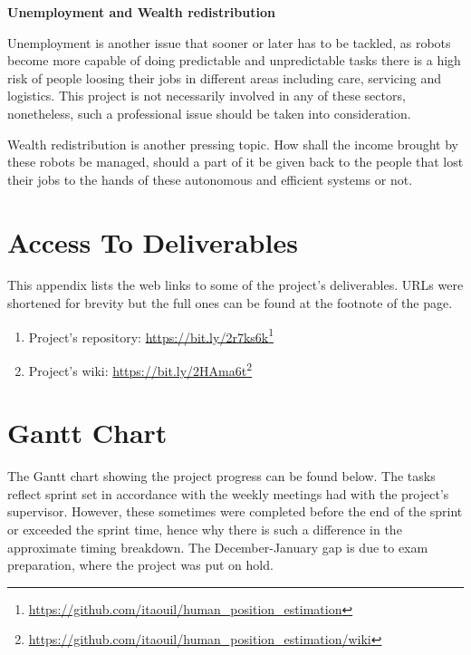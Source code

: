 \begin{appendices}
\textbf{Unemployment and Wealth redistribution}

Unemployment is another issue that sooner or later has to be tackled, as robots become more capable of doing predictable and unpredictable tasks there is a high risk of people loosing their jobs in different areas including care, servicing and logistics. This project is not necessarily involved in any of these sectors, nonetheless, such a professional issue should be taken into consideration.

Wealth redistribution is another pressing topic. How shall the income brought by these robots be managed, should a part of it be given back to the people that lost their jobs to the hands of these autonomous and efficient systems or not.

\chapter{Access To Deliverables}

This appendix lists the web links to some of the project's deliverables. URLs were shortened for brevity but the full ones can be found at the footnote of the page.

\begin{enumerate}
  \item Project's repository: \url{https://bit.ly/2r7ks6k}\footnote{\url{https://github.com/itaouil/human_position_estimation}}
  \item Project's wiki: \url{https://bit.ly/2HAma6t}\footnote{\url{https://github.com/itaouil/human_position_estimation/wiki}}
\end{enumerate}

\chapter{Gantt Chart}

The Gantt chart showing the project progress can be found below. The tasks reflect sprint set in accordance with the weekly meetings had with the project's supervisor. However, these sometimes were completed before the end of the sprint or exceeded the sprint time, hence why there is such a difference in the approximate timing breakdown. The December-January gap is due to exam preparation, where the project was put on hold.

\begin{landscape}

            \newcommand{\myWeek}{
                \themyWeekNum
                \stepcounter{myWeekNum}
                \ifnum\themyWeekNum=04
                    \setcounter{myWeekNum}{1}
                \else\fi
            }


\end{landscape}
\end{appendices}
